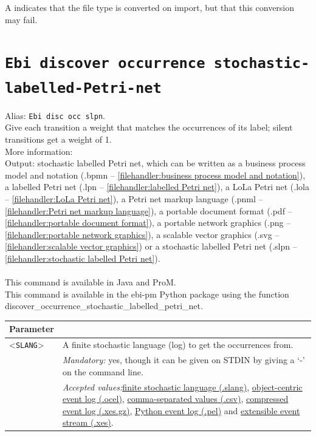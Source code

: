 {\begin{tabularx}{\linewidth}{lX}
\bottomrule
\end{tabularx}
A \textdagger{} indicates that the file type is converted on import, but that this conversion may fail.
\clearpage\section{\texttt{Ebi discover occurrence stochastic-labelled-Petri-net}}
\label{command:Ebi discover occurrence stochastic-labelled-Petri-net}
Alias: \texttt{Ebi disc occ slpn}.\\
Give each transition a weight that matches the occurrences of its label; silent transitions get a weight of 1.\\
More information: ~\cite{DBLP:conf/icpm/BurkeLW20}~\\
\noindent Output: stochastic labelled Petri net, which can be written as a business process model and notation (.bpmn -- \cref{filehandler:business process model and notation}), a labelled Petri net (.lpn -- \cref{filehandler:labelled Petri net}), a LoLa Petri net (.lola -- \cref{filehandler:LoLa Petri net}), a Petri net markup language (.pnml -- \cref{filehandler:Petri net markup language}), a portable document format (.pdf -- \cref{filehandler:portable document format}), a portable network graphics (.png -- \cref{filehandler:portable network graphics}), a scalable vector graphics (.svg -- \cref{filehandler:scalable vector graphics}) or a stochastic labelled Petri net (.slpn -- \cref{filehandler:stochastic labelled Petri net}).\\
\\This command is available in Java and ProM.
\\This command is available in the ebi-pm Python package using the function discover\_occurrence\_stochastic\_labelled\_petri\_net.
\begin{tabularx}{\linewidth}{lX}
\toprule
Parameter \\\midrule
<\texttt{SLANG}>&A finite stochastic language (log) to get the occurrences from.\\
&\textit{Mandatory:} \quad yes, though it can be given on STDIN by giving a `-' on the command line.\\
&\textit{Accepted values:}\quad \hyperref[filehandler:finite stochastic language]{finite stochastic language (.slang)}, \hyperref[filehandler:object-centric event log]{object-centric event log (.ocel)}, \hyperref[filehandler:comma-separated values]{comma-separated values (.csv)}, \hyperref[filehandler:compressed event log]{compressed event log (.xes.gz)}, \hyperref[filehandler:Python event log]{Python event log (.pel)} and \hyperref[filehandler:extensible event stream]{extensible event stream (.xes)}.\\

\end{tabularx}}
